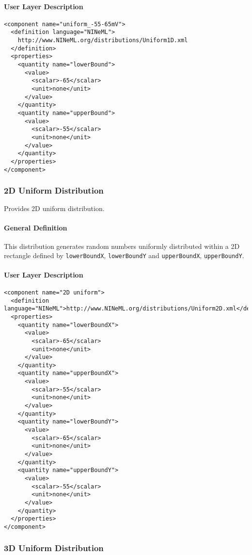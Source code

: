 \documentclass{article}
\begin{document}
\paragraph{User Layer Description}
\begin{verbatim}
<component name="uniform_-55-65mV">
  <definition language="NINeML">
    http://www.NINeML.org/distributions/Uniform1D.xml
  </definition>
  <properties>
    <quantity name="lowerBound">
      <value>
        <scalar>-65</scalar>
        <unit>none</unit>
      </value>
    </quantity>
    <quantity name="upperBound">
      <value>
        <scalar>-55</scalar>
        <unit>none</unit>
      </value>
    </quantity>
  </properties>
</component>
\end{verbatim}

\subsubsection{2D Uniform Distribution}
\label{uniform2D}

Provides 2D uniform distribution.

\paragraph{General Definition}
This distribution generates random numbers uniformly distributed within a 2D
rectangle defined by {\tt lowerBoundX}, {\tt lowerBoundY} and {\tt upperBoundX},
{\tt upperBoundY}.

\paragraph{User Layer Description}
\begin{verbatim}
<component name="2D uniform">
  <definition language="NINeML">http://www.NINeML.org/distributions/Uniform2D.xml</definition>
  <properties>
    <quantity name="lowerBoundX">
      <value>
        <scalar>-65</scalar>
        <unit>none</unit>
      </value>
    </quantity>
    <quantity name="upperBoundX">
      <value>
        <scalar>-55</scalar>
        <unit>none</unit>
      </value>
    </quantity>
    <quantity name="lowerBoundY">
      <value>
        <scalar>-65</scalar>
        <unit>none</unit>
      </value>
    </quantity>
    <quantity name="upperBoundY">
      <value>
        <scalar>-55</scalar>
        <unit>none</unit>
      </value>
    </quantity>
  </properties>
</component>
\end{verbatim}

\subsubsection{3D Uniform Distribution}
\label{uniform3D}
\end{document}
